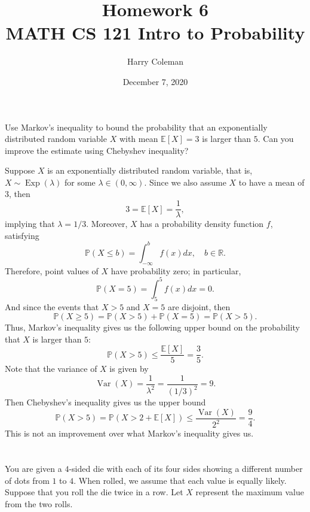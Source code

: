 \documentclass[12pt]{article}
\newenvironment{problem}
    {\begin{lrbox}{\mybox}\begin{minipage}{0.98\textwidth}}
    {\end{minipage}\end{lrbox}\framebox[\textwidth]{\usebox{\mybox}}}
\newcommand{\R}{\mathbb{R}}
\renewcommand{\P}{\mathbb{P}}
\newcommand{\E}{\mathbb{E}}
\newcommand{\Var}{\operatorname{Var}}
\newcommand{\Exp}{\operatorname{Exp}}
\begin{document}
 
\title{Homework 6\\
    \large MATH CS 121 Intro to Probability
}
\author{Harry Coleman}
\date{December 7, 2020}
\maketitle

\section{}
\begin{problem}
    Use Markov's inequality to bound the probability that an exponentially distributed random variable $X$ with mean $\E[X] = 3$ is larger than $5$. Can you improve the estimate using Chebyshev inequality?
\end{problem}
\medskip

Suppose $X$ is an exponentially distributed random variable, that is, $X \sim \Exp(\lambda)$ for some $\lambda \in (0, \infty)$. Since we also assume $X$ to have a mean of $3$, then
\[
    3 = \E[X] = \frac{1}{\lambda},
\]
implying that $\lambda = 1/3$. Moreover, $X$ has a probability density function $f$, satisfying
\[
    \P(X \leq b) = \int_{-\infty}^{b} f(x) dx, \quad b \in \R.
\]
Therefore, point values of $X$ have probability zero; in particular,
\[
    \P(X = 5) = \int_{5}^{5} f(x) dx = 0.
\]
And since the events that $X > 5$ and $X = 5$ are disjoint, then
\[
    \P(X \geq 5) = \P(X > 5) + \P(X = 5) = \P(X > 5).
\]
Thus, Markov's inequality gives us the following upper bound on the probability that $X$ is larger than $5$:
\[
    \P(X > 5) \leq \frac{\E[X]}{5} = \frac{3}{5}.
\]
Note that the variance of $X$ is given by
\[
    \Var(X) = \frac{1}{\lambda^2} = \frac{1}{(1/3)^2} = 9.
\]
Then Chebyshev's inequality gives us the upper bound
\[
    \P(X > 5) = \P(X > 2 + \E[X]) \leq \frac{\Var(X)}{2^2} = \frac{9}{4}.
\]
This is not an improvement over what Markov's inequality gives us.



\newpage
\section{}
\begin{problem}
    You are given a $4$-sided die with each of its four sides showing a different number of dots from $1$ to $4$. When rolled, we assume that each value is equally likely. Suppose that you roll the die twice in a row. Let $X$ represent the maximum value from the two rolls.
\end{problem}
\end{document}
